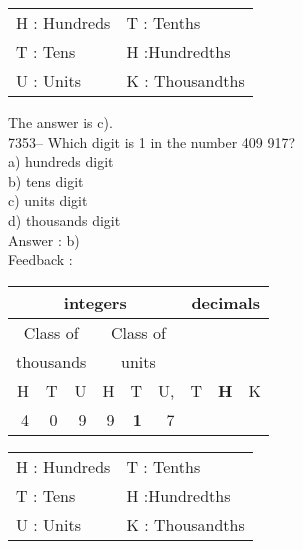 \documentclass[letterpaper, 12pt]{article}
\begin{document}
\scriptsize
\begin{center}
\begin{tabular}{ll}
H : Hundreds & T\up{th} : Tenths\\
T : Tens & H\up{th} :Hundredths\\
U : Units & K\up{e} : Thousandths\\
\end{tabular}
\end{center}

\normalsize
The answer is c).\\



7353-- Which digit is  1 in the number 409 917?\\

a) hundreds digit\\
b) tens digit\\
c) units digit\\
d) thousands digit\\

Answer : b)\\

Feedback :\\
\begin{center}
\begin{tabular}{|rrr|rrr|rrr|}
\hline
\multicolumn{6}{|c|}{integers} &\multicolumn{3}{|c|}{decimals} \\
\hline
\multicolumn{3}{|c|}{Class of} &\multicolumn{3}{|c|}{Class of} &  \multicolumn{3}{c|}{} \\
\multicolumn{3}{|c|}{thousands} &\multicolumn{3}{|c|}{units} &  \multicolumn{3}{c|}{} \\
\hline
H & T & U &H & T & U, & T\up{th} & \textbf{H\up{th}} & K\up{th} \\
\hline
\hline
4 & 0 & 9 & 9 & \textbf{1} & 7 & & & \\
\hline
\end{tabular}
\end{center}

\scriptsize
\begin{center}
\begin{tabular}{ll}
H : Hundreds & T\up{th} : Tenths\\
T : Tens & H\up{th} :Hundredths\\
U : Units & K\up{e} : Thousandths\\
\end{tabular}
\end{center}
\end{document}
